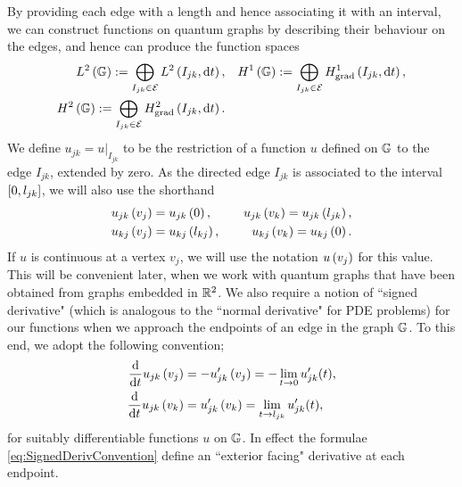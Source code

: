 By providing each edge with a length and hence associating it with an interval, we can construct functions on quantum graphs by describing their behaviour on the edges, and hence can produce the function spaces
\begin{subequations} \label{eq:GraphFuncSpaces}
	\begin{align}
		L^2\left( \mathbb{G} \right) := \bigoplus_{I_{jk}\in \mathcal{E}} L^{2}\left( I_{jk},\mathrm{d}t \right),
		&\quad H^1\left( \mathbb{G} \right) := \bigoplus_{I_{jk}\in \mathcal{E}} H^1_\mathrm{grad}\left( I_{jk}, \mathrm{d}t \right), \\
		H^2\left( \mathbb{G} \right) := \bigoplus_{I_{jk}\in \mathcal{E}} H^2_\mathrm{grad}\left( I_{jk}, \mathrm{d} t \right). &
	\end{align}
\end{subequations}
We define $u_{jk} = u\vert_{I_{jk}}$ to be the restriction of a function $u$ defined on $\mathbb{G}$ to the edge $I_{jk}$, extended by zero.
As the directed edge $I_{jk}$ is associated to the interval $\left[ 0,l_{jk} \right]$, we will also use the shorthand
\begin{align*}
	u_{jk}\left( v_j \right) &= u_{jk}\left( 0 \right), &\quad
	u_{jk}\left( v_k \right) = u_{jk}\left( l_{jk} \right), \\
	u_{kj}\left( v_j \right) &= u_{kj}\left( l_{kj} \right), &\quad
	u_{kj}\left( v_k \right) = u_{kj}\left( 0 \right).
\end{align*}
If $u$ is continuous at a vertex $v_j$, we will use the notation $u\left( v_j \right)$ for this value.
This will be convenient later, when we work with quantum graphs that have been obtained from graphs embedded in $\mathbb{R}^2$.
We also require a notion of ``signed derivative" (which is analogous to the ``normal derivative" for PDE problems) for our functions when we approach the endpoints of an edge in the graph $\mathbb{G}$.
To this end, we adopt the following convention;
\begin{subequations} \label{eq:SignedDerivConvention}
	\begin{align}
		\dfrac{\mathrm{d}}{\mathrm{d}t}u_{jk}\left( v_j \right) &= -u_{jk}'\left( v_j \right) = -\lim_{t\rightarrow0}u_{jk}'(t), \\
		\dfrac{\mathrm{d}}{\mathrm{d}t}u_{jk}\left( v_k \right) &= u_{jk}'\left( v_k \right) = \lim_{t\rightarrow l_{jk}}u_{jk}'(t),
	\end{align}
\end{subequations}
for suitably differentiable functions $u$ on $\mathbb{G}$. 
In effect the formulae \eqref{eq:SignedDerivConvention} define an ``exterior facing" derivative at each endpoint. \newline
 
